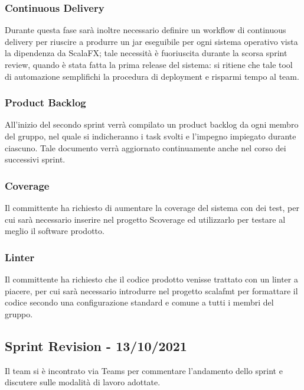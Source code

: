\subsubsection{Continuous Delivery}
Durante questa fase sarà inoltre necessario definire un workflow di continuous delivery per riuscire a produrre un
jar eseguibile per ogni sistema operativo vista la dipendenza da ScalaFX; tale necessità è fuoriuscita durante la
scorsa sprint review, quando è stata fatta la prima release del sistema: si ritiene che tale tool di automazione
semplifichi la procedura di deployment e risparmi tempo al team.

\subsubsection{Product Backlog}
All'inizio del secondo sprint verrà compilato un product backlog da ogni membro del gruppo, nel quale si indicheranno
i task svolti e l'impegno impiegato durante ciascuno. Tale documento verrà aggiornato continuamente anche nel corso
dei successivi sprint.

\subsubsection{Coverage}
Il committente ha richiesto di aumentare la coverage del sistema con dei test, per cui sarà necessario
inserire nel progetto Scoverage ed utilizzarlo per testare al meglio il software prodotto.

\subsubsection{Linter}
Il committente ha richiesto che il codice prodotto venisse trattato con un linter a piacere, per cui sarà necessario
introdurre nel progetto scalafmt per formattare il codice secondo una configurazione standard e comune a tutti i membri
del gruppo.

\subsection{Sprint Revision - 13/10/2021}
Il team si è incontrato via Teams per commentare l'andamento dello sprint e discutere sulle modalità di lavoro adottate.

